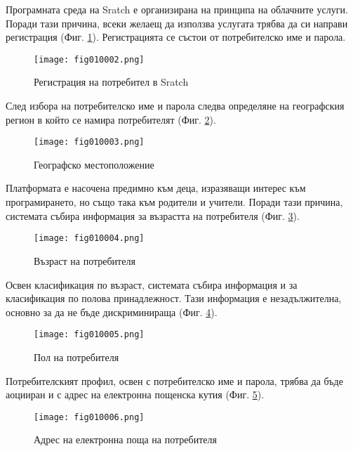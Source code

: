 Програмната среда на Sratch е организирана на принципа на облачните услуги. Поради тази причина, всеки желаещ да използва услугата трябва да си направи регистрация (Фиг. \ref{fig010002}). Регистрацията се състои от потребителско име и парола.

\begin{figure}[H]
  \centering
  \texttt{[image: fig010002.png]}
  \caption{Регистрация на потребител в Sratch}
\label{fig010002}
\end{figure}

След избора на потребителско име и парола следва определяне на географския регион в който се намира потребителят (Фиг. \ref{fig010003}).

\begin{figure}[H]
  \centering
  \texttt{[image: fig010003.png]}
  \caption{Географско местоположение}
\label{fig010003}
\end{figure}

Платформата е насочена предимно към деца, изразяващи интерес към програмирането, но също така към родители и учители. Поради тази причина, системата събира информация за възрастта на потребителя (Фиг. \ref{fig010004}).

\begin{figure}[H]
  \centering
  \texttt{[image: fig010004.png]}
  \caption{Възраст на потребителя}
\label{fig010004}
\end{figure}

Освен класификация по възраст, системата събира информация и за класификация по полова принадлежност. Тази информация е незадължителна, основно за да не бъде дискриминираща (Фиг. \ref{fig010005}).

\begin{figure}[H]
  \centering
  \texttt{[image: fig010005.png]}
  \caption{Пол на потребителя}
\label{fig010005}
\end{figure}

Потребителският профил, освен с потребителско име и парола, трябва да бъде аоцииран и с адрес на електронна пощенска кутия (Фиг. \ref{fig010006}).

\begin{figure}[H]
  \centering
  \texttt{[image: fig010006.png]}
  \caption{Адрес на електронна поща на потребителя}
\label{fig010006}
\end{figure}

